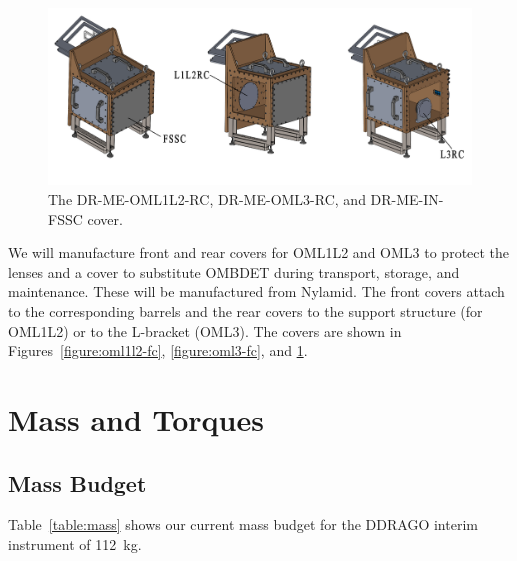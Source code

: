 \documentclass{article}
\newcommand{\TODO}[1]{\textcolor{red}{TODO: #1}}
\begin{document}
\begin{figure}[p]
\begin{center}
\includegraphics[width=\linewidth]{newfigures/SSCoverPlates.png}
\end{center}
\caption{The DR-ME-OML1L2-RC, DR-ME-OML3-RC, and DR-ME-IN-FSSC cover.}
\label{figure:covers}
\end{figure}

We will manufacture front and rear covers for OML1L2 and OML3 to protect the lenses and a cover to substitute OMBDET during transport, storage, and maintenance. These will be manufactured from Nylamid. The front covers attach to the corresponding barrels and the rear covers to the support structure (for OML1L2) or to the L-bracket (OML3). The covers are shown in Figures~\ref{figure:oml1l2-fc}, \ref{figure:oml3-fc}, and \ref{figure:covers}.

\clearpage
\section{Mass and Torques}

\subsection{Mass Budget}


Table~\ref{table:mass} shows our current mass budget for the DDRAGO interim instrument of 112~kg.
\end{document}
